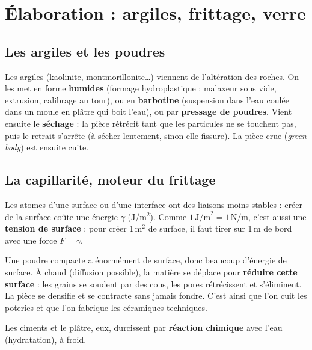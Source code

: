 \section{Élaboration : argiles, frittage, verre}

\subsection*{Les argiles et les poudres}

Les argiles (kaolinite, montmorillonite\ldots) viennent de l'altération des roches. On les met en
forme \textbf{humides} (formage hydroplastique : malaxeur sous vide, extrusion, calibrage au
tour), ou en \textbf{barbotine} (suspension dans l'eau coulée dans un moule en plâtre qui boit
l'eau), ou par \textbf{pressage de poudres}. Vient ensuite le \textbf{séchage} : la pièce
rétrécit tant que les particules ne se touchent pas, puis le retrait s'arrête (à sécher
lentement, sinon elle fissure). La pièce crue (\emph{green body}) est ensuite cuite.

\subsection*{La capillarité, moteur du frittage}

\begin{defnbox}[title={Énergie de surface}]
Les atomes d'une surface ou d'une interface ont des liaisons moins stables : créer de la
surface coûte une énergie $\gamma$ (J/m$^2$). Comme $1\,\text{J/m}^2 = 1\,\text{N/m}$, c'est
aussi une \textbf{tension de surface} : pour créer 1\,m$^2$ de surface, il faut tirer sur 1\,m de
bord avec une force $F = \gamma$.
\end{defnbox}


\begin{propbox}[title={Le frittage (\emph{sintering})}]
Une poudre compacte a énormément de surface, donc beaucoup d'énergie de surface. À chaud
(diffusion possible), la matière se déplace pour \textbf{réduire cette surface} : les grains se
soudent par des \og cous\fg{}, les pores rétrécissent et s'éliminent. La pièce se densifie et se
contracte sans jamais fondre. C'est ainsi que l'on cuit les poteries et que l'on fabrique les
céramiques techniques.
\end{propbox}

Les ciments et le plâtre, eux, durcissent par \textbf{réaction chimique} avec l'eau
(hydratation), à froid.

